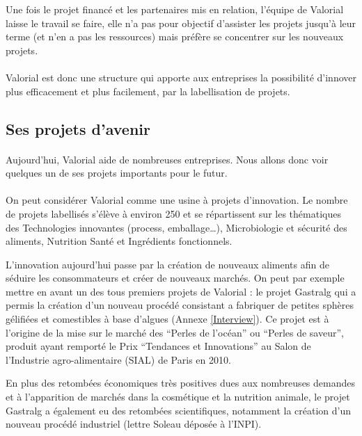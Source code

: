 \documentclass[a4paper,12pt]{report}
\begin{document}
    			Une fois le projet financé et les partenaires mis en relation, l’équipe de Valorial laisse le travail se faire, elle n’a pas pour objectif d’assister les projets jusqu’à leur terme (et n’en a pas les ressources) mais préfère se concentrer sur les nouveaux projets.
    			
  			\paragraph{}Valorial est donc une structure qui apporte aux entreprises la possibilité d'innover plus efficacement et plus facilement, par la labellisation de projets.
				
		\subsection{Ses projets d'avenir}
				\paragraph{}Aujourd'hui, Valorial aide de nombreuses entreprises. Nous allons donc voir quelques un de ses projets importants pour le futur.
				
				\paragraph{}On peut considérer Valorial comme une usine à projets d’innovation. Le nombre de projets labellisés s’élève à environ 250 et se répartissent sur les thématiques des Technologies innovantes (process, emballage…), Microbiologie et sécurité des aliments, Nutrition Santé et Ingrédients fonctionnels\cite{ProjetsAboutis}.

   				L’innovation aujourd’hui passe par la création de nouveaux aliments afin de séduire les consommateurs et créer de nouveaux marchés. On peut par exemple mettre en avant un des tous premiers projets de Valorial : le projet Gastralg qui a permis la création d’un nouveau procédé consistant a fabriquer de petites sphères gélifiées et comestibles à base d’algues (Annexe \ref{Interview}). Ce projet est à l’origine de la mise sur le marché des  “Perles de l’océan” ou “Perles de saveur”, produit ayant remporté le Prix “Tendances et Innovations” au Salon de l’Industrie agro-alimentaire (SIAL) de Paris en 2010.
    
				En plus des retombées économiques très positives dues aux nombreuses demandes et à l’apparition de marchés dans la cosmétique et la nutrition animale, le projet Gastralg a également eu des retombées scientifiques, notamment la création d’un nouveau procédé industriel (lettre Soleau déposée à l’INPI).
\end{document}
